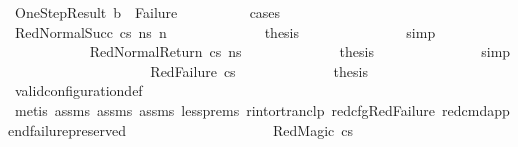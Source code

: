 \begin{isabellebody}
\ OneStepResult{\isacharcolon}{\kern0pt}\ {\isachardoublequoteopen}b\ {\isasymnoteq}\ Failure{\isachardoublequoteclose}\isanewline
\ \ \ \ \ \ \ \ \isamarkupfalse%
\ cases\isanewline
\ \ \ \ \ \ \ \ \ \ \isamarkupfalse%
\ {\isacharparenleft}{\kern0pt}RedNormalSucc\ cs\ ns{\isacharprime}{\kern0pt}\ n{\isacharprime}{\kern0pt}{\isacharparenright}{\kern0pt}\isanewline
\ \ \ \ \ \ \ \ \ \ \isamarkupfalse%
\ \isamarkupfalse%
\ {\isacharquery}{\kern0pt}thesis\ \isanewline
\ \ \ \ \ \ \ \ \ \ \ \ \isamarkupfalse%
\ simp\isanewline
\ \ \ \ \ \ \ \ \isamarkupfalse%
\isanewline
\ \ \ \ \ \ \ \ \ \ \isamarkupfalse%
\ {\isacharparenleft}{\kern0pt}RedNormalReturn\ cs\ ns{\isacharprime}{\kern0pt}{\isacharparenright}{\kern0pt}\isanewline
\ \ \ \ \ \ \ \ \ \ \isamarkupfalse%
\ \isamarkupfalse%
\ {\isacharquery}{\kern0pt}thesis\ \isanewline
\ \ \ \ \ \ \ \ \ \ \ \ \isamarkupfalse%
\ simp\isanewline
\ \ \ \ \ \ \ \ \isamarkupfalse%
\isanewline
\ \ \ \ \ \ \ \ \ \ \isamarkupfalse%
\ {\isacharparenleft}{\kern0pt}RedFailure\ cs{\isacharparenright}{\kern0pt}\isanewline
\ \ \ \ \ \ \ \ \ \ \isamarkupfalse%
\ \isamarkupfalse%
\ {\isacharquery}{\kern0pt}thesis\isanewline
\ \ \ \ \ \ \ \ \ \ \ \ \isamarkupfalse%
\ valid{\isacharunderscore}{\kern0pt}configuration{\isacharunderscore}{\kern0pt}def\isanewline
\ \ \ \ \ \ \ \ \ \ \ \ \isamarkupfalse%
\ {\isacharparenleft}{\kern0pt}metis\ assms{\isacharparenleft}{\kern0pt}{}{\isacharparenright}{\kern0pt}\ assms{\isacharparenleft}{\kern0pt}{}{\isacharparenright}{\kern0pt}\ assms{\isacharparenleft}{\kern0pt}{}{\isacharparenright}{\kern0pt}\ less{\isachardot}{\kern0pt}prems{\isacharparenleft}{\kern0pt}{}{\isacharparenright}{\kern0pt}\ r{\isacharunderscore}{\kern0pt}into{\isacharunderscore}{\kern0pt}rtranclp\ red{\isacharunderscore}{\kern0pt}cfg{\isachardot}{\kern0pt}RedFailure\ red{\isacharunderscore}{\kern0pt}cmd{\isacharunderscore}{\kern0pt}append{\isacharunderscore}{\kern0pt}failure{\isacharunderscore}{\kern0pt}preserved{\isacharparenright}{\kern0pt}\isanewline
\ \ \ \ \ \ \ \ \isamarkupfalse%
\isanewline
\ \ \ \ \ \ \ \ \ \ \isamarkupfalse%
\ {\isacharparenleft}{\kern0pt}RedMagic\ cs{\isacharparenright}{\kern0pt}\isanewline
\ \ \ \ \ \ \ \ \ \ \isamarkupfalse%

\end{isabellebody}
